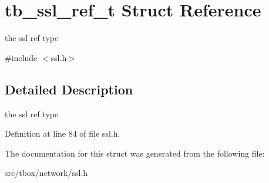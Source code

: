 \hypertarget{structtb__ssl__ref__t}{\section{tb\-\_\-ssl\-\_\-ref\-\_\-t Struct Reference}
\label{structtb__ssl__ref__t}
}


the ssl ref type  




{\ttfamily \#include $<$ssl.\-h$>$}



\subsection{Detailed Description}
the ssl ref type 

Definition at line 84 of file ssl.\-h.



The documentation for this struct was generated from the following file\-:\begin{DoxyCompactItemize}
\item 
src/tbox/network/ssl.\-h\end{DoxyCompactItemize}
